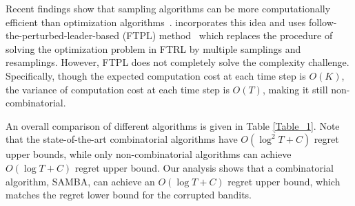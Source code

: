 Recent findings show that sampling algorithms can be more computationally efficient than optimization algorithms~\cite{ma2019sampling,sun2023revisiting}. 
\citet{honda2023follow} incorporates this idea and uses follow-the-perturbed-leader-based (FTPL) method~\cite{abernethy2015fighting,kalai2005efficient} which replaces the procedure of solving the optimization problem in FTRL by multiple samplings and resamplings. 
However, FTPL does not completely solve the complexity challenge. Specifically, though the expected computation cost at each time step is $O(K)$, the variance of computation cost at each time step is $O(T)$, making it still non-combinatorial.


An overall comparison of different algorithms is given in Table \ref{Table_1}. Note that the state-of-the-art combinatorial algorithms have $O(\log^2 T+C)$ regret upper bounds, 
while only non-combinatorial algorithms can achieve $O(\log T + C)$ regret upper bound. 
Our analysis shows that a combinatorial algorithm, SAMBA, can achieve an $O(\log T + C)$ regret upper bound, which matches the regret lower bound for the corrupted bandits.